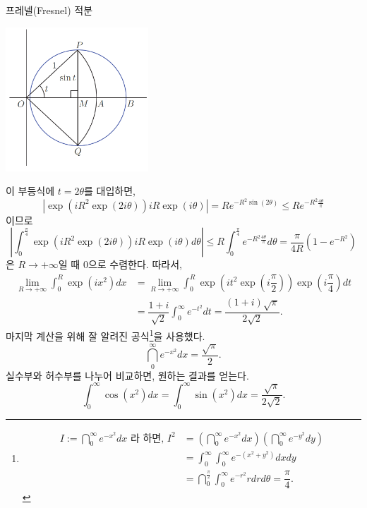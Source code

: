 \begin{saltexample}[label=example-4-20]{프레넬(Fresnel) 적분}{}
\begin{center}
\includegraphics[width=0.4\textwidth]{./SaltChapter/figs/fig-4-5}
\end{center}
\label{fig-4-5}
\saltfigskip
이 부등식에 $t=2\theta$를 대입하면,
\[
\left| \exp(iR^2\exp(2i\theta))iR\exp(i\theta) \right|
= Re^{-R^2\sin(2\theta)} \le Re^{-R^2\frac{4\theta}\pi}
\]
이므로
\[
\left| \int_0^{\frac\pi4} \exp(iR^2\exp(2i\theta))iR\exp(i\theta) d\theta\right|
\le R \int_0^{\frac\pi4} e^{-R^2\frac{4\theta}\pi}d\theta
= \dfrac\pi{4R}(1-e^{-R^2})
\]
은 $R\to +\infty$일 때 $0$으로 수렴한다.
따라서, 
\begin{align*}
\lim_{R\to+\infty} \int_0^R \exp(ix^2)dx 
&=  \lim_{R\to+\infty}\int_0^R  \exp\left( it^2\exp\left( i\dfrac\pi2 \right)\right)
\exp\left(i\dfrac\pi4\right) dt \\
&= \dfrac{1+i}{\sqrt{2}} \int_0^\infty e^{-t^2}dt 
= \dfrac{(1+i)\sqrt{\pi}}{2\sqrt{2}}.
\end{align*}
마지막 계산을 위해 잘 알려진 공식\footnote{
\begin{align*}
I:=\dint_0^\infty e^{-x^2} dx\text{  라 하면, \ } 
I^2 &= \left(\dint_0^\infty e^{-x^2} dx\right)\left(\dint_0^\infty e^{-y^2} dy\right) \\
&= \int_0^\infty \int_0^\infty e^{-(x^2+y^2)}dxdy \\
&= \dint_0^{\frac\pi2} \int_0^\infty e^{-r^2}rdrd\theta = \dfrac\pi4.
\end{align*}
}을 사용했다.
\[
\dint_0^\infty e^{-x^2} dx = \dfrac{\sqrt{\pi}}2.
\]
실수부와 허수부를 나누어 비교하면, 원하는 결과를 얻는다.
\[
\int_0^\infty \cos(x^2) dx =  \int_0^\infty \sin(x^2) dx 
= \dfrac{\sqrt{\pi}}{2\sqrt{2}}.
\]
\end{saltexample}

